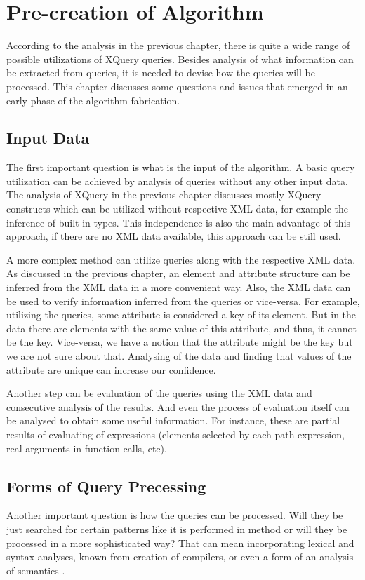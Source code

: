 \chapter{Pre-creation of Algorithm} \label{CHAPTER_precreation_of_algorithm}
According to the analysis in the previous chapter, there is quite a wide range of possible utilizations of XQuery queries. Besides analysis of what information can be extracted from queries, it is needed to devise how the queries will be processed. This chapter discusses some questions and issues that emerged in an early phase of the algorithm fabrication.

\section{Input Data}
The first important question is what is the input of the algorithm. A basic query utilization can be achieved by analysis of queries without any other input data. The analysis of XQuery in the previous chapter discusses mostly XQuery constructs which can be utilized without respective XML data, for example the inference of built-in types. This independence is also the main advantage of this approach, if there are no XML data available, this approach can be still used. 

A more complex method can utilize queries along with the respective XML data. As discussed in the previous chapter, an element and attribute structure can be inferred from the XML data in a more convenient way. Also, the XML data can be used to verify information inferred from the queries or vice-versa. For example, utilizing the queries, some attribute is considered a key of its element. But in the data there are elements with the same value of this attribute, and thus, it cannot be the key. Vice-versa, we have a notion that the attribute might be the key but we are not sure about that. Analysing of the data and finding that values of the attribute are unique can increase our confidence. 

Another step can be evaluation of the queries using the XML data and consecutive analysis of the results. And even the process of evaluation itself can be analysed to obtain some useful information. For instance, these are partial results of evaluating of expressions (elements selected by each path expression, real arguments in function calls, etc).

\section{Forms of Query Precessing}
Another important question is how the queries can be processed. Will they be just searched for certain patterns like it is performed in method \cite{Necasky:2009:DXK:1529282.1529414} or will they be processed in a more sophisticated way? That can mean incorporating lexical and syntax analyses, known from creation of compilers, or even a form of an analysis of semantics \cite{compilers}.

